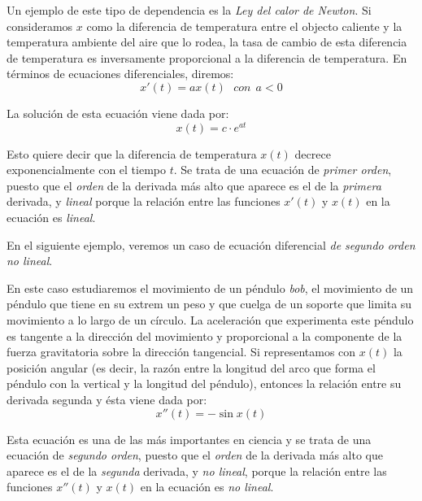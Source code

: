 \begin{example}\label{ex:calor}
Un ejemplo de este tipo de dependencia es la \emph{Ley del calor de Newton}. Si consideramos $x$ como la diferencia de temperatura entre el objecto caliente y la temperatura ambiente del aire que lo rodea, la tasa de cambio de esta diferencia de temperatura es inversamente proporcional a la diferencia de temperatura. En términos de ecuaciones diferenciales, diremos:
\begin{equation}
x'(t) = ax(t)~~~con~~ a<0
\end{equation}

La solución de esta ecuación viene dada por:
\begin{equation}
x(t) = c\cdot e^{at}
\end{equation}

Esto quiere decir que la diferencia de temperatura $x(t)$ decrece exponencialmente con el tiempo $t$. Se trata de una ecuación  de \emph{primer orden}, puesto que el \emph{orden} de la derivada más alto que aparece es el de la \emph{primera} derivada, y \emph{lineal} porque la relación entre las funciones $x'(t)$ y $x(t)$ en la ecuación es \emph{lineal}.
\end{example}

En el siguiente ejemplo, veremos un caso de ecuación diferencial \emph{de segundo orden} \emph{no lineal}.

\begin{example}[Péndulo]
En este caso estudiaremos el movimiento de un péndulo \emph{bob}, el movimiento de un péndulo que tiene en su extrem un peso y que cuelga de un soporte que limita su movimiento a lo largo de un círculo. La aceleración que experimenta este péndulo es tangente a la dirección del movimiento y proporcional a la componente de la fuerza gravitatoria sobre la dirección tangencial. Si representamos con $x(t)$ la posición angular (es decir, la razón entre la longitud del arco que forma el péndulo con la vertical y la longitud del péndulo), entonces la relación entre su derivada segunda y ésta viene dada por:
\begin{equation}
x''(t) = -\sin x(t)
\end{equation}

Esta ecuación es una de las más importantes en ciencia y se trata de una ecuación de \emph{segundo orden}, puesto que el \emph{orden} de la derivada más alto que aparece es el de la \emph{segunda} derivada, y \emph \emph{no lineal}, porque la relación entre las funciones $x''(t)$ y $x(t)$ en la ecuación es \emph{no lineal}.
\end{example}



